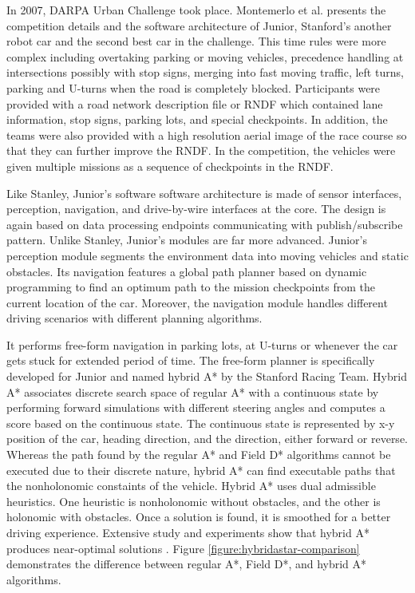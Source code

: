 In 2007, DARPA Urban Challenge took place. Montemerlo et al. \cite{cite1}
presents the competition details and the software architecture of Junior,
Stanford's another robot car and the second best car in the challenge. This
time rules were more complex including overtaking parking or moving vehicles,
precedence handling at intersections possibly with stop signs, merging into
fast moving traffic, left turns, parking and U-turns when the road is
completely blocked. Participants were provided with a road network description
file or RNDF which contained lane information, stop signs, parking lots, and
special checkpoints. In addition, the teams were also provided with a high
resolution aerial image of the race course so that they can further improve the
RNDF. In the competition, the vehicles were given multiple missions as a
sequence of checkpoints in the RNDF.

Like Stanley, Junior's software software architecture is made of sensor
interfaces, perception, navigation, and drive-by-wire interfaces at the core.
The design is again based on data processing endpoints communicating with
publish/subscribe pattern. Unlike Stanley, Junior's modules are far more
advanced.  Junior's perception module segments the environment data into moving
vehicles and static obstacles. Its navigation features a global path planner
based on dynamic programming to find an optimum path to the mission checkpoints
from the current location of the car. Moreover, the navigation module handles
different driving scenarios with different planning algorithms.

It performs free-form navigation in parking lots, at U-turns or whenever the
car gets stuck for extended period of time. The free-form planner is
specifically developed for Junior and named hybrid A* by the Stanford Racing
Team. Hybrid A* associates discrete search space of regular A* with a
continuous state by performing forward simulations with different steering
angles and computes a score based on the continuous state. The continuous state
is represented by x-y position of the car, heading direction, and the
direction, either forward or reverse. Whereas the path found by the regular A*
and Field D* algorithms cannot be executed due to their discrete nature, hybrid
A* can find executable paths that the nonholonomic constaints of the vehicle.
Hybrid A* uses dual admissible heuristics. One heuristic is nonholonomic
without obstacles, and the other is holonomic with obstacles. Once a solution
is found, it is smoothed for a better driving experience. Extensive study and
experiments show that hybrid A* produces near-optimal solutions
\cite{Dolgov2010PathPF, Petereit2012Application}. Figure
\ref{figure:hybridastar-comparison} demonstrates the difference between regular
A*, Field D*, and hybrid A* algorithms.

